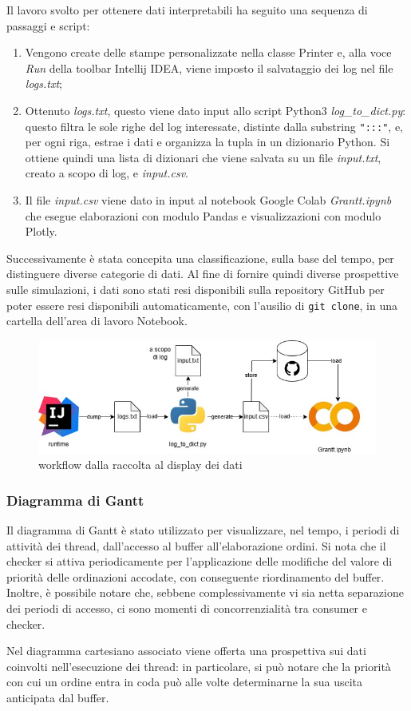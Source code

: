 Il lavoro svolto per ottenere dati interpretabili ha seguito una sequenza di passaggi e script:
\begin{enumerate}
	\item Vengono create delle stampe personalizzate nella classe Printer e, alla voce \textit{Run} della toolbar Intellij IDEA, viene imposto il salvataggio dei log nel file \textit{logs.txt};
	\item Ottenuto  \textit{logs.txt}, questo viene dato input allo script Python3 \textit{log\_to\_dict.py}: questo filtra le sole righe del log interessate, distinte dalla substring \texttt{":::"}, e, per ogni riga, estrae i dati e organizza la tupla in un dizionario Python. Si ottiene quindi una lista di dizionari che viene salvata su un file \textit{input.txt}, creato a scopo di log, e \textit{input.csv}.
	\item Il file \textit{input.csv} viene dato in input al notebook Google Colab \textit{Grantt.ipynb} che esegue elaborazioni con modulo Pandas e visualizzazioni con modulo Plotly.
\end{enumerate}
Successivamente è stata concepita una classificazione, sulla base del tempo, per distinguere diverse categorie di dati.
Al fine di fornire quindi diverse prospettive sulle simulazioni, i dati sono stati resi disponibili sulla repository GitHub per poter essere resi disponibili automaticamente, con l'ausilio di \texttt{git clone}, in una cartella dell'area di lavoro Notebook.

\begin{figure}[htbp]
	\centering
	\includegraphics[scale=0.35]{iterazione3/images/DataAnalisysThread.jpg}
	\caption{workflow dalla raccolta al display dei dati
 \label{fig:dataanalysisthread}}
\end{figure}

\subsubsection{Diagramma di Gantt}
Il diagramma di Gantt è stato utilizzato per visualizzare, nel tempo, i periodi di attività dei thread, dall'accesso al buffer all'elaborazione ordini. Si nota che il checker si attiva periodicamente per l'applicazione delle modifiche del valore di priorità delle ordinazioni accodate, con conseguente riordinamento del buffer.
Inoltre, è possibile notare che, sebbene complessivamente vi sia netta separazione dei periodi di accesso, ci sono momenti di concorrenzialità tra consumer e checker.

Nel diagramma cartesiano associato viene offerta una prospettiva sui dati coinvolti nell'esecuzione dei thread: in particolare, si può notare che la priorità con cui un ordine entra in coda può alle volte determinarne la sua uscita anticipata dal buffer.

\clearpage